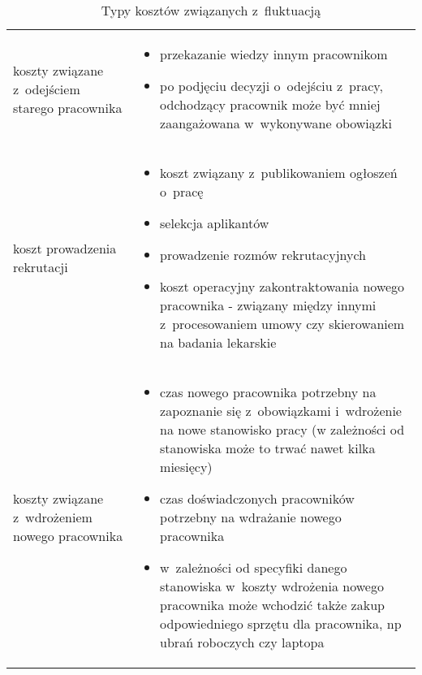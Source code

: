 \noindent
\begin{table}
    \raggedright\caption{Typy kosztów związanych z~fluktuacją\label{tabela:fluktuacja-koszty}}
    \begin{center}
        \begin{tabular}{|P{.15\textwidth}|p{.75\textwidth}|}

            \hline
             &
             \\
            \hline

            koszty związane z~odejściem starego pracownika &
            \begin{itemize}
                \item przekazanie wiedzy innym pracownikom
                \item po podjęciu decyzji o~odejściu z~pracy, odchodzący pracownik może być mniej zaangażowana w~wykonywane obowiązki
            \end{itemize} \\

            \hline

            koszt prowadzenia rekrutacji &
            \begin{itemize}
                \item koszt związany z~publikowaniem ogłoszeń o~pracę
                \item selekcja aplikantów
                \item prowadzenie rozmów rekrutacyjnych
                \item koszt operacyjny zakontraktowania nowego pracownika - związany między innymi z~procesowaniem umowy czy skierowaniem na badania lekarskie
            \end{itemize} \\
            \hline

            koszty związane z~wdrożeniem nowego pracownika &
            \begin{itemize}
                \item czas nowego pracownika potrzebny na zapoznanie się z~obowiązkami i~wdrożenie na nowe stanowisko pracy (w zależności od stanowiska może to trwać nawet kilka miesięcy)
                \item czas doświadczonych pracowników potrzebny na wdrażanie nowego pracownika
                \item w~zależności od specyfiki danego stanowiska w~koszty wdrożenia nowego pracownika może wchodzić także zakup odpowiedniego sprzętu dla pracownika, np ubrań roboczych czy laptopa
            \end{itemize} \\
            \hline


\end{tabular}
\end{center}
\end{table}
